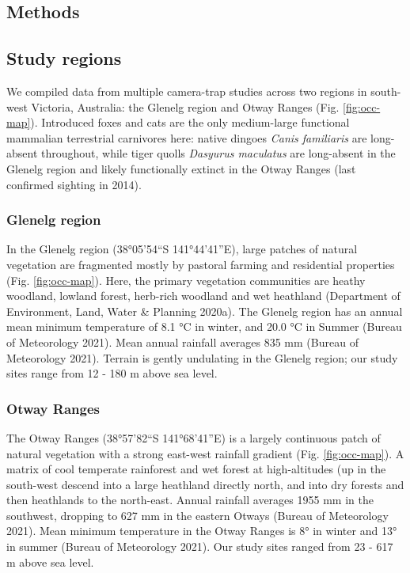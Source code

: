 \documentclass[11pt,a4paper,titlepage,twoside,openright]{style/unimelbthesis}
\begin{document}
\begin{mainmatter}
\newpage

\hypertarget{methods-1}{%
\section{Methods}\label{methods-1}}

\hypertarget{study-regions}{%
\subsection{Study regions}\label{study-regions}}

We compiled data from multiple camera-trap studies across two regions in south-west Victoria, Australia: the Glenelg region and Otway Ranges (Fig. \ref{fig:occ-map}). Introduced foxes and cats are the only medium-large functional mammalian terrestrial carnivores here: native dingoes \emph{Canis familiaris} are long-absent throughout, while tiger quolls \emph{Dasyurus maculatus} are long-absent in the Glenelg region and likely functionally extinct in the Otway Ranges (last confirmed sighting in 2014).

\hypertarget{glenelg-region}{%
\subsubsection{Glenelg region}\label{glenelg-region}}

In the Glenelg region (38°05'54``S 141°44'41''E), large patches of natural vegetation are fragmented mostly by pastoral farming and residential properties (Fig. \ref{fig:occ-map}). Here, the primary vegetation communities are heathy woodland, lowland forest, herb-rich woodland and wet heathland (Department of Environment, Land, Water \& Planning 2020a). The Glenelg region has an annual mean minimum temperature of 8.1 °C in winter, and 20.0 °C in Summer (Bureau of Meteorology 2021). Mean annual rainfall averages 835 mm (Bureau of Meteorology 2021). Terrain is gently undulating in the Glenelg region; our study sites range from 12 - 180 m above sea level.

\hypertarget{otway-ranges}{%
\subsubsection{Otway Ranges}\label{otway-ranges}}

The Otway Ranges (38°57'82``S 141°68'41''E) is a largely continuous patch of natural vegetation with a strong east-west rainfall gradient (Fig. \ref{fig:occ-map}). A matrix of cool temperate rainforest and wet forest at high-altitudes (up in the south-west descend into a large heathland directly north, and into dry forests and then heathlands to the north-east. Annual rainfall averages 1955 mm in the southwest, dropping to 627 mm in the eastern Otways (Bureau of Meteorology 2021). Mean minimum temperature in the Otway Ranges is 8° in winter and 13° in summer (Bureau of Meteorology 2021). Our study sites ranged from 23 - 617 m above sea level.


\end{mainmatter}
\end{document}
